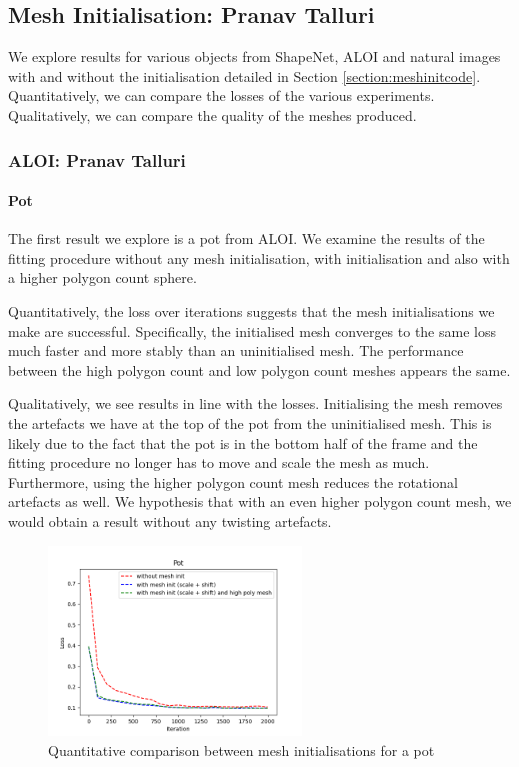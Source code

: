 \documentclass{article}
\begin{document}
\newpage
\subsection{Mesh Initialisation: Pranav Talluri}

We explore results for various objects from ShapeNet, ALOI and natural images with and without the initialisation detailed in Section \ref{section:meshinitcode}. Quantitatively, we can compare the losses of the various experiments. Qualitatively, we can compare the quality of the meshes produced.

\subsubsection{ALOI: Pranav Talluri}
\paragraph{Pot}
The first result we explore is a pot from ALOI. We examine the results of the fitting procedure without any mesh initialisation, with initialisation and also with a higher polygon count sphere.

Quantitatively, the loss over iterations suggests that the mesh initialisations we make are successful. Specifically, the initialised mesh converges to the same loss much faster and more stably than an uninitialised mesh. The performance between the high polygon count and low polygon count meshes appears the same.

Qualitatively, we see results in line with the losses. Initialising the mesh removes the artefacts we have at the top of the pot from the uninitialised mesh. This is likely due to the fact that the pot is in the bottom half of the frame and the fitting procedure no longer has to move and scale the mesh as much. Furthermore, using the higher polygon count mesh reduces the rotational artefacts as well. We hypothesis that with an even higher polygon count mesh, we would obtain a result without any twisting artefacts.

\begin{figure}[h!]
  \centering
  \includegraphics[width=0.6\textwidth]{images/potplot.png}
  \caption{Quantitative comparison between mesh initialisations for a pot}
  \label{results-pot-loss}
\end{figure}
\end{document}
